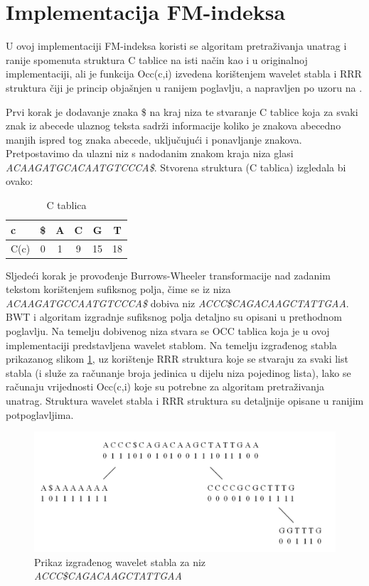 \section{Implementacija FM-indeksa}
U ovoj implementaciji FM-indeksa koristi se algoritam pretraživanja unatrag i ranije spomenuta struktura C tablice na isti način kao i u originalnoj implementaciji, ali je funkcija Occ(c,i) izvedena korištenjem wavelet stabla i RRR struktura čiji je princip objašnjen u ranijem poglavlju, a napravljen po uzoru na \cite{fm3}.

Prvi korak je dodavanje znaka \$ na kraj niza te stvaranje C tablice koja za svaki znak iz abecede ulaznog teksta sadrži informacije koliko je znakova abecedno manjih ispred tog znaka abecede, uključujući i ponavljanje znakova. Pretpostavimo da ulazni niz s nadodanim znakom kraja niza glasi \emph{ACAAGATGCACAATGTCCCA\$}. Stvorena struktura (C tablica) izgledala bi ovako:

\begin{table}[htb]
\caption{C tablica}
\label{tbl:ctabl}
\centering
\begin{tabular}{|l||ccccc|} \hline
c & \$ & A & C & G & T \\ \hline
C(c) & 0 & 1 & 9 & 15 & 18 \\ \hline
\end{tabular}
\end{table}

\vspace{3 mm}
Sljedeći korak je provođenje Burrows-Wheeler transformacije nad zadanim tekstom  \linebreak korištenjem sufiksnog polja, čime se iz niza \emph{ACAAGATGCCAATGTCCCA\$} dobiva niz \emph{ACCC\$CAGACAAGCTATTGAA}. BWT i algoritam izgradnje sufiksnog polja detaljno su opisani u prethodnom poglavlju.
Na temelju dobivenog niza stvara se OCC tablica koja je u ovoj implementaciji predstavljena wavelet stablom. Na temelju izgrađenog stabla prikazanog slikom  \ref{fmWaveletTree}, uz korištenje RRR struktura koje se stvaraju za svaki list stabla (i služe za računanje broja jedinica u dijelu niza pojedinog lista), lako se računaju  vrijednosti Occ(c,i) koje su potrebne za algoritam pretraživanja unatrag. Struktura wavelet stabla i RRR struktura su detaljnije opisane u ranijim potpoglavljima. 


\begin{figure}[H]
\centering
\includegraphics[width=\linewidth]{./pictures/fmStablo.png}
\caption{Prikaz izgrađenog wavelet stabla za niz \emph{ACCC\$CAGACAAGCTATTGAA}}\label{fmWaveletTree}
\end{figure}


